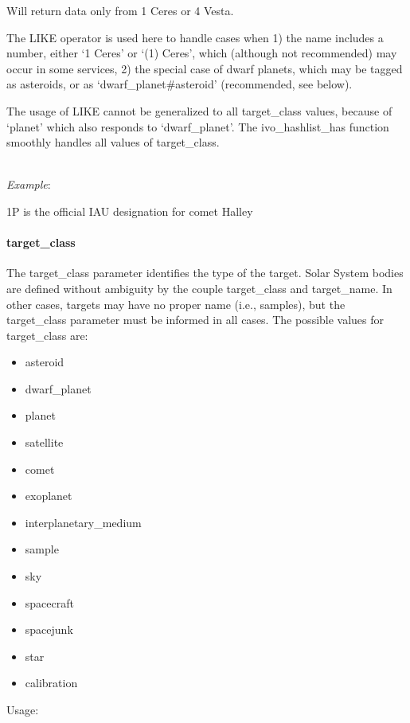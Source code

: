 \documentclass[11pt,a4paper]{ivoa}
\begin{document}
Will return data only from 1 Ceres or 4 Vesta.

The LIKE operator is used here to handle cases when 1) the name includes a
number, either `1 Ceres' or `(1) Ceres', which (although not recommended)
may occur in some services, 2) the special case of dwarf planets, which
may be tagged as asteroids, or as `dwarf\_planet\#asteroid' (recommended,
see below).

The usage of LIKE cannot be generalized to all target\_class values,
because of  `planet' which also responds to `dwarf\_planet'.
The ivo\_hashlist\_has function smoothly handles all values
of target\_class.

\textbf{\\}
\emph{Example}:

1P is the official IAU designation for comet Halley

\paragraph{target\_class}

The target\_class parameter identifies the type of the target. Solar
System bodies are defined without ambiguity by the couple target\_class
and target\_name. In other cases, targets may have no proper name
(i.e., samples), but the target\_class parameter must be informed in
all cases. The possible values for target\_class are:

\begin{itemize}
\item asteroid
\item dwarf\_planet
\item planet
\item satellite
\item comet
\item exoplanet
\item interplanetary\_medium
\item sample
\item sky
\item spacecraft
\item spacejunk
\item star
\item calibration
\end{itemize}

Usage:
\end{document}
